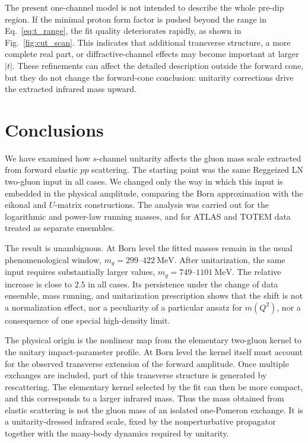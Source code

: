 \documentclass[aps,prd,twocolumn,superscriptaddress,longbibliography,nofootinbib]{revtex4-2}
\newcommand{\MeV}{\mathrm{MeV}}
\begin{document}
The present one-channel model is not intended to describe the whole
pre-dip region. If the minimal proton form factor is pushed beyond the
range in Eq.~\eqref{eq:t_range}, the fit quality deteriorates rapidly,
as shown in Fig.~\ref{fig:cut_scan}. This indicates that additional
transverse structure, a more complete real part, or diffractive-channel
effects may become important at larger $|t|$. These refinements can
affect the detailed description outside the forward cone, but they do
not change the forward-cone conclusion: unitarity corrections drive the
extracted infrared mass upward.



\section{Conclusions}
\label{sec:conclusions}

We have examined how $s$-channel unitarity affects the gluon mass scale
extracted from forward elastic $pp$ scattering. The starting point was
the same Reggeized LN two-gluon input in all cases. We changed only the
way in which this input is embedded in the physical amplitude, comparing
the Born approximation with the eikonal and $U$-matrix constructions.
The analysis was carried out for the logarithmic and power-law running
masses, and for ATLAS and TOTEM data treated as separate ensembles.

The result is unambiguous. At Born level the fitted masses remain in the
usual phenomenological window, $m_g=299$--$422~\MeV$. After
unitarization, the same input requires substantially larger values,
$m_g=749$--$1101~\MeV$. The relative increase is close to $2.5$ in all
cases. Its persistence under the change of data ensemble, mass running,
and unitarization prescription shows that the shift is not a
normalization effect, nor a peculiarity of a particular ansatz for
$m(Q^2)$, nor a consequence of one special high-density limit.

The physical origin is the nonlinear map from the elementary two-gluon
kernel to the unitary impact-parameter profile. At Born level the kernel
itself must account for the observed transverse extension of the forward
amplitude. Once multiple exchanges are included, part of this transverse
structure is generated by rescattering. The elementary kernel selected
by the fit can then be more compact, and this corresponds to a larger
infrared mass. Thus the mass obtained from elastic scattering is not the
gluon mass of an isolated one-Pomeron exchange. It is a
unitarity-dressed infrared scale, fixed by the nonperturbative
propagator together with the many-body dynamics required by unitarity.
\end{document}
